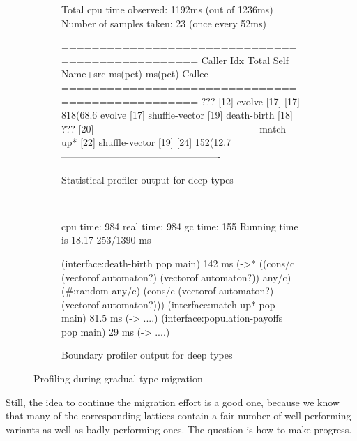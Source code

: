 \begin{figure}[htb]
\begin{subfigure}[t]{0.53\columnwidth}
    \footnotesize
    \begin{boxedverbatim}
  Total cpu time observed: 1192ms (out of 1236ms)
  Number of samples taken: 23 (once every 52ms)

=================================================
                              Caller
 Idx   Total       Self      Name+src
       ms(pct)     ms(pct)    Callee
=================================================
                              ??? [12]
                              evolve [17]
[17]  818(68.6%
                              evolve [17]
                              shuffle-vector [19]
                              death-birth [18]
                              ??? [20]
-------------------------------------------------
                              match-up* [22]
                              shuffle-vector [19]
[24]  152(12.7%
-------------------------------------------------
    \end{boxedverbatim}
    \caption{Statistical profiler output for deep types} \label{f:fsm-code:statistical}
  \end{subfigure}~\begin{subfigure}[t]{0.44\columnwidth}
    \footnotesize
    \begin{boxedverbatim}
cpu time: 984 real time: 984 gc time: 155
Running time is 18.17%
253/1390 ms

(interface:death-birth pop main)
  142 ms
  (->* ((cons/c (vectorof automaton?)
                (vectorof automaton?))
        any/c)
       (#:random any/c)
       (cons/c (vectorof automaton?)
               (vectorof automaton?)))
(interface:match-up* pop main)
  81.5 ms
  (-> ....)
(interface:population-payoffs pop main)
  29 ms
  (-> ....)


    \end{boxedverbatim}
    \caption{Boundary profiler output for deep types} \label{f:fsm-code:boundary}
  \end{subfigure}

  \caption{Profiling during gradual-type migration} \label{f:fsm-code}
\end{figure}

Still, the idea to continue the migration effort is a good one, because we know
that many of the corresponding lattices contain a fair number of well-performing
variants as well as badly-performing ones. The question is how to make progress.

